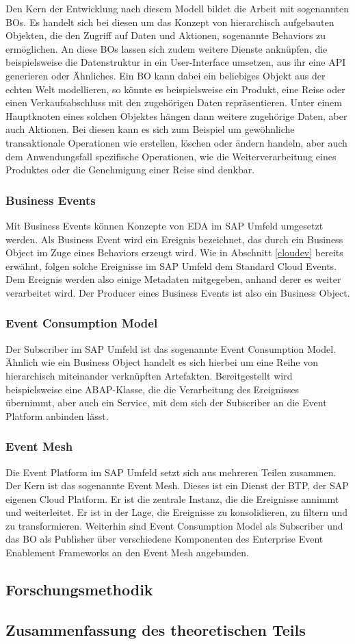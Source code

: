 Den Kern der Entwicklung nach diesem Modell bildet die Arbeit mit sogenannten \ac{BO}s. Es handelt sich bei diesen um das Konzept von hierarchisch aufgebauten Objekten, die den Zugriff auf Daten und Aktionen, sogenannte Behaviors zu ermöglichen. An diese \ac{BO}s lassen sich zudem weitere Dienste anknüpfen, die beispielsweise die Datenstruktur in ein User-Interface umsetzen, aus ihr eine \ac{API} generieren oder Ähnliches. Ein \ac{BO} kann dabei ein beliebiges Objekt aus der echten Welt modellieren, so könnte es beispielsweise ein Produkt, eine Reise oder einen Verkaufsabschluss mit den zugehörigen Daten repräsentieren. Unter einem Hauptknoten eines solchen Objektes hängen dann weitere zugehörige Daten, aber auch Aktionen. Bei diesen kann es sich zum Beispiel um gewöhnliche transaktionale Operationen wie erstellen, löschen oder ändern handeln, aber auch dem Anwendungsfall spezifische Operationen, wie die Weiterverarbeitung eines Produktes oder die Genehmigung einer Reise sind denkbar.\citepls

\subsubsection*{Business Events}
Mit Business Events können Konzepte von \ac*{EDA} im SAP Umfeld umgesetzt werden. Als Business Event wird ein Ereignis bezeichnet, das durch ein Business Object im Zuge eines Behaviors erzeugt wird. Wie in Abschnitt \ref{cloudev} bereits erwähnt, folgen solche Ereignisse im SAP Umfeld dem Standard Cloud Events. Dem Ereignis werden also einige Metadaten mitgegeben, anhand derer es weiter verarbeitet wird. Der Producer eines Business Events ist also ein Business Object. 

\subsubsection*{Event Consumption Model}
Der Subscriber im SAP Umfeld ist das sogenannte Event Consumption Model. Ähnlich wie ein Business Object handelt es sich hierbei um eine Reihe von hierarchisch miteinander verknüpften Artefakten. Bereitgestellt wird beispielsweise eine \ac{ABAP}-Klasse, die die Verarbeitung des Ereignisses übernimmt, aber auch ein Service, mit dem sich der Subscriber an die Event Platform anbinden lässt. \citepls

\subsubsection*{Event Mesh}
Die Event Platform im  SAP Umfeld setzt sich aus mehreren Teilen zusammen. Der Kern ist das sogenannte Event Mesh. Dieses ist ein Dienst der \ac{BTP}, der SAP eigenen Cloud Platform. Er ist die zentrale Instanz, die die Ereignisse annimmt und weiterleitet. Er ist in der Lage, die Ereignisse zu konsolidieren, zu filtern und zu transformieren. \citepls Weiterhin sind Event Consumption Model als Subscriber und das \ac*{BO} als Publisher über verschiedene Komponenten des Enterprise Event Enablement Frameworks an den Event Mesh angebunden. \citepls

\subsection{Forschungsmethodik}
\subsection{Zusammenfassung des theoretischen Teils}
